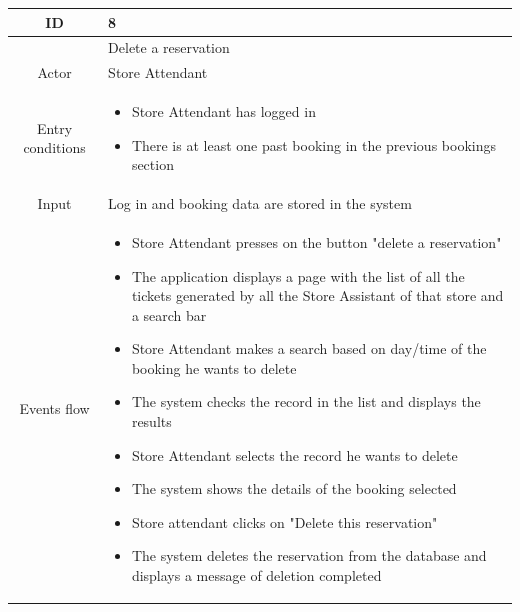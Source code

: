 \documentclass[table, 12pt]{article}
\begin{document}
\begin{longtable}{|c| p{10cm}|}
    \hline
    ID               & 8                                                                                                                                        \\
    \hline
                     & Delete a reservation                                                                                                                     \\
    \hline
    Actor            & Store Attendant                                                                                                                          \\
    \hline
    Entry conditions & \begin{itemize}
        \item Store Attendant has logged in
        \item There is at least one past booking in the previous bookings section
    \end{itemize}                                                                                                               \\ \hline
    Input            & Log in and booking data are stored in the system                                                                                         \\
    \hline
    Events flow      & \begin{itemize}[nosep,after=\strut]
        \item Store Attendant presses on the button "delete a reservation"
        \item The application displays a page with the list of all the tickets generated by all the Store Assistant of that store and a search bar
        \item Store Attendant makes a search based on day/time of the booking he wants to delete
        \item The system checks the record in the list and displays the results
        \item Store Attendant selects the record he wants to delete
        \item The system shows the details of the booking selected
        \item Store attendant clicks on "Delete this reservation"
        \item The system deletes the reservation from the database and displays a message of deletion completed
    \end{itemize}                                                                                                               \\

\end{longtable}
\end{document}
